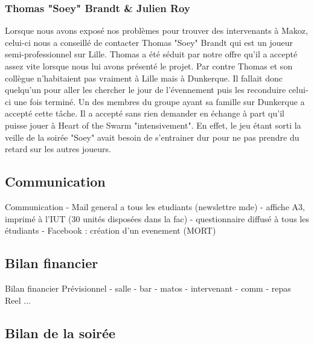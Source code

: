 \subsubsection{Thomas "Soey" Brandt \& Julien Roy}%
\label{ssub:tthomas_soey_brandt_&_julien_roy}

Lorsque nous avons exposé nos problèmes pour trouver des intervenants à
Makoz, celui-ci nous a conseillé de contacter Thomas "Soey" Brandt qui
est un joueur semi-professionnel sur Lille. Thomas a été séduit par
notre offre qu'il a accepté assez vite lorsque nous lui avons présenté
le projet. Par contre Thomas et son collègue n'habitaient pas vraiment à
Lille mais à Dunkerque. Il fallait donc quelqu'un pour aller les
chercher le jour de l'évennement puis les reconduire celui-ci une fois
terminé. Un des membres du groupe ayant sa famille sur Dunkerque a
accepté cette tâche. Il a accepté sans rien demander en échange à part
qu'il puisse jouer à Heart of the Swarm "intensivement". En effet, le
jeu étant sorti la veille de la soirée "Soey" avait besoin de
s'entrainer dur pour ne pas prendre du retard sur les autres joueurs.


\subsection{Communication}%
\label{sub:communication}

Communication
        - Mail general a tous les etudiants (newslettre mde)
        - affiche A3, imprimé à l'IUT (30 unités disposées dans la fac)
        - questionnaire diffusé à tous les étudiants
        - Facebook : création d'un evenement (MORT)

\subsection{Bilan financier}%
\label{sub:bilan_financier}

Bilan financier
        Prévisionnel
            - salle
            - bar
            - matos
            - intervenant
            - comm
            - repas
        Reel
           ...

\subsection{Bilan de la soirée}%
\label{sub:Bilan_de_la_soiree}

